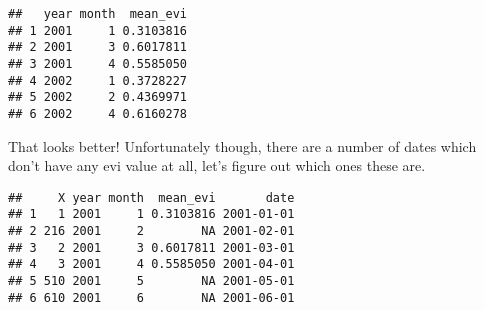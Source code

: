 \documentclass[
]{report}
\newenvironment{Shaded}{\begin{snugshade}}{\end{snugshade}}
\newcommand{\AttributeTok}[1]{\textcolor[rgb]{0.77,0.63,0.00}{#1}}
\newcommand{\CommentTok}[1]{\textcolor[rgb]{0.56,0.35,0.01}{\textit{#1}}}
\newcommand{\ConstantTok}[1]{\textcolor[rgb]{0.00,0.00,0.00}{#1}}
\newcommand{\DecValTok}[1]{\textcolor[rgb]{0.00,0.00,0.81}{#1}}
\newcommand{\FloatTok}[1]{\textcolor[rgb]{0.00,0.00,0.81}{#1}}
\newcommand{\FunctionTok}[1]{\textcolor[rgb]{0.00,0.00,0.00}{#1}}
\newcommand{\NormalTok}[1]{#1}
\newcommand{\OtherTok}[1]{\textcolor[rgb]{0.56,0.35,0.01}{#1}}
\newcommand{\SpecialCharTok}[1]{\textcolor[rgb]{0.00,0.00,0.00}{#1}}
\newcommand{\StringTok}[1]{\textcolor[rgb]{0.31,0.60,0.02}{#1}}
\begin{document}
\begin{verbatim}
##   year month  mean_evi
## 1 2001     1 0.3103816
## 2 2001     3 0.6017811
## 3 2001     4 0.5585050
## 4 2002     1 0.3728227
## 5 2002     2 0.4369971
## 6 2002     4 0.6160278
\end{verbatim}

That looks better! Unfortunately though, there are a number of dates
which don't have any evi value at all, let's figure out which ones these
are.

\begin{Shaded}
\end{Shaded}

\begin{verbatim}
##     X year month  mean_evi       date
## 1   1 2001     1 0.3103816 2001-01-01
## 2 216 2001     2        NA 2001-02-01
## 3   2 2001     3 0.6017811 2001-03-01
## 4   3 2001     4 0.5585050 2001-04-01
## 5 510 2001     5        NA 2001-05-01
## 6 610 2001     6        NA 2001-06-01
\end{verbatim}

\begin{Shaded}
\end{Shaded}
\end{document}
